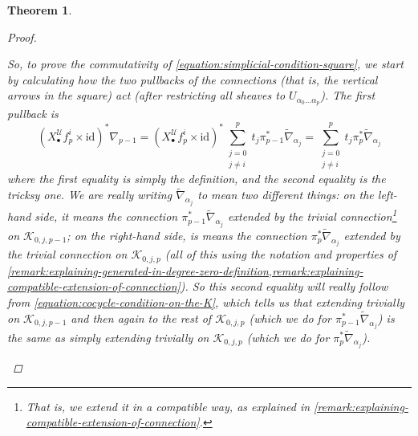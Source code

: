 \documentclass[11pt,fleqn]{article}
\theoremstyle{plain}
\newtheorem{theorem}{Theorem}[subsection]
\theoremstyle{definition}
\theoremstyle{remark}
\numberwithin{equation}{theorem}
\newcommand{\cover}{\mathcal{U}}
\newcommand{\id}{\mathrm{id}}
\newcommand{\nerve}[1]{X_{#1}^\cover}
\begin{document}
\begin{theorem}
\begin{proof}
\begin{enumerate}
                        So, to prove the commutativity of \cref{equation:simplicial-condition-square}, we start by calculating how the two pullbacks of the connections (that is, the vertical arrows in the square) act (after restricting all sheaves to $U_{\alpha_0\ldots\alpha_p}$).
                        The first pullback is
                        \begin{equation*}
                            \left(\nerve{\bullet}f_p^i\times\id\right)^*\nabla_{p-1}
                            =
                            \left(\nerve{\bullet}f_p^i\times\id\right)^* \sum_{\substack{j=0\\j\neq i}}^p t_j\pi_{p-1}^*\widetilde{\nabla}_{\alpha_j}
                            =
                            \sum_{\substack{j=0\\j\neq i}}^p t_j\pi_{p}^*\widetilde{\nabla}_{\alpha_j}
                        \end{equation*}
                        where the first equality is simply the definition, and the second equality is the tricksy one.
                        We are really writing $\widetilde{\nabla}_{\alpha_j}$ to mean two different things: on the left-hand side, it means the connection $\pi_{p-1}^*\widetilde{\nabla}_{\alpha_j}$ extended by the trivial connection\footnote{That is, we extend it in a compatible way, as explained in \cref{remark:explaining-compatible-extension-of-connection}.} on $\mathcal{K}_{0,j,p-1}$; on the right-hand side, is means the connection $\pi_p^*\widetilde{\nabla}_{\alpha_j}$ extended by the trivial connection on $\mathcal{K}_{0,j,p}$ (all of this using the notation and properties of \cref{remark:explaining-generated-in-degree-zero-definition,remark:explaining-compatible-extension-of-connection}).
                        So this second equality will really follow from \cref{equation:cocycle-condition-on-the-K}, which tells us that extending trivially on $\mathcal{K}_{0,j,p-1}$ and then again to the rest of $\mathcal{K}_{0,j,p}$ (which we do for $\pi_{p-1}^*\widetilde{\nabla}_{\alpha_j}$) is the same as simply extending trivially on $\mathcal{K}_{0,j,p}$ (which we do for $\pi_{p}^*\widetilde{\nabla}_{\alpha_j}$).


\end{enumerate}
\end{proof}
\end{theorem}
\end{document}
